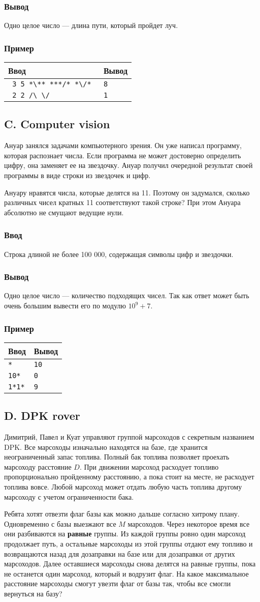 \documentclass[10pt, a4paper]{article}
\newcommand{\informat}[1]
{
	\subsubsection*{Ввод} #1
}
\newcommand{\outformat}[1]
{
	\subsubsection*{Вывод} #1
}
\newcommand{\examplee}[4]
{
	\subsubsection*{Пример}
	\noindent
	\begin{center}
	\begin{tabularx}{\linewidth}{|X|X|}
	\hline
	Ввод 	& Вывод  	\\
	\hline
	{\tt #1} & {\tt #2}	\\
	\hline
	{\tt #3} & {\tt #4}	\\
	\hline
	\end{tabularx}
	\end{center}
}
\newcommand{\exampleee}[6]
{
	\subsubsection*{Пример}
	\noindent
	\begin{center}
	\begin{tabularx}{\linewidth}{|X|X|}
	\hline
	Ввод 	& Вывод  	\\
	\hline
	{\tt #1} & {\tt #2}	\\
	\hline
	{\tt #3} & {\tt #4}	\\
	\hline
	{\tt #5} & {\tt #6}	\\
	\hline
	\end{tabularx}
	\end{center}
}
\begin{document}
\outformat{Одно целое число --- длина пути, который пройдет луч.}

\examplee
{
3 5 \newline
*\textbackslash***\newline
***/*\newline
*\textbackslash*/*
}
{8}
{
2 2 \newline
/\textbackslash \newline
\textbackslash/}
{1}




\subsection*{C. Computer vision}
 

Ануар занялся задачами компьютерного зрения. Он уже написал программу, которая распознает числа. Если программа не может достоверно определить цифру, она заменяет ее на звездочку. Ануар получил очередной результат своей программы в виде строки из звездочек и цифр. 

Ануару нравятся числа, которые делятся на 11. Поэтому он задумался, сколько различных чисел кратных 11 соответствуют такой строке? При этом Ануара абсолютно не смущают ведущие нули.

\informat{Строка длиной не более 100 000, содержащая символы цифр и звездочки.}

\outformat{Одно целое число --- количество подходящих чисел. Так как ответ может быть очень большим вывести его по модулю $10^9+7$.}

\exampleee{**}{10}{10*}{0}{1*1*}{9}




\subsection*{D. DPK rover}
 

Димитрий, Павел и Куат управляют группой марсоходов с секретным названием DPK. Все марсоходы изначально находятся на базе, где хранится неограниченный запас топлива. Полный бак топлива позволяет проехать марсоходу расстояние $D$. При движении марсоход расходует топливо пропорционально пройденному расстоянию, а пока стоит на месте, не расходует топлива вовсе. Любой марсоход может отдать любую часть топлива другому марсоходу с учетом ограниченности бака.

Ребята хотят отвезти флаг базы как можно дальше согласно хитрому плану. Одновременно с базы выезжают все $M$ марсоходов. Через некоторое время все они разбиваются на \textbf{равные} группы. Из каждой группы ровно один марсоход продолжает путь, а остальные марсоходы из этой группы отдают ему топливо и возвращаются назад для дозаправки на базе или для дозаправки от других марсоходов. Далее оставшиеся марсоходы снова делятся на равные группы, пока не останется один марсоход, который и водрузит флаг. На какое максимальное расстояние марсоходы смогут увезти флаг от базы так, чтобы все смогли вернуться на базу?
\end{document}

